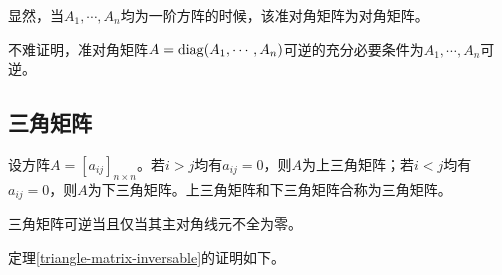 \begin{remark}
    显然，当$A_1,\cdots,A_n$均为一阶方阵的时候，该准对角矩阵为对角矩阵。
\end{remark}

\begin{remark}
    不难证明，准对角矩阵$A=\mathrm{diag}(A_1,\cdots,A_n)$可逆的充分必要条件为$A_1,\cdots,A_n$可逆。
\end{remark}

\subsection{三角矩阵}

\begin{definition}
    \label{triangle-matrix}
    设方阵$A=[a_{ij}]_{n\times n}$。若$i>j$均有$a_{ij}=0$，则$A$为上三角矩阵；若$i<j$均有$a_{ij}=0$，则$A$为下三角矩阵。上三角矩阵和下三角矩阵合称为三角矩阵。
\end{definition}

\begin{thm}
    \label{triangle-matrix-inversable}
    三角矩阵可逆当且仅当其主对角线元不全为零。
\end{thm}

定理\ref{triangle-matrix-inversable}的证明如下。

